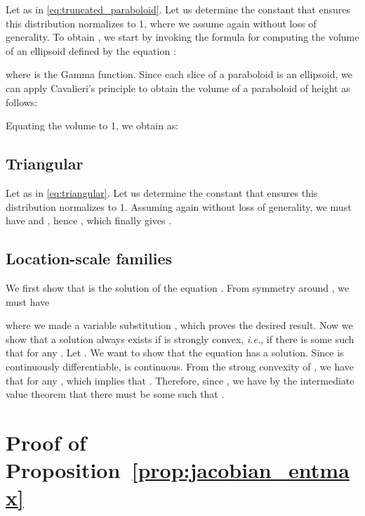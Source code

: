 \documentclass{article}
\newcommand{\remove}[1]{}
\begin{document}
Let  as in \eqref{eq:truncated_paraboloid}.
Let us determine the constant  that ensures this distribution normalizes to 1, where we assume again  without loss of generality. To obtain , we start by invoking the formula for computing the volume of an ellipsoid defined
by the equation :

where  is the Gamma function.
Since each slice of a paraboloid is an ellipsoid, we can apply Cavalieri's principle to obtain the volume of a paraboloid  of height  as follows:

Equating the volume to 1, we obtain  as:


\subsection{Triangular}\label{sec:proof_triangular}

Let  as in \eqref{eq:triangular}.
Let us determine the constant  that ensures this distribution normalizes to 1.
Assuming again  without loss of generality, we must have
 and , hence
, which finally gives
.

\remove{
The negentropy of this distribution is

}

\subsection{Location-scale families}\label{sec:proof_location_scale}

We first show that  is the solution of the equation .
From symmetry around , we must have

where we made a variable substitution ,
which proves the desired result.
Now we show that a solution always exists if  is strongly convex, {\it i.e.}, if there is some  such that
 for any .
Let . We want to show that the equation  has a solution. Since  is continuously differentiable,  is continuous.
From the strong convexity of , we have that  for any , which implies that .
Therefore, since , we have by the intermediate value theorem that there must be some  such that .








\section{Proof of Proposition~\ref{prop:jacobian_entmax}}\label{sec:proof_jacobian_entmax}
\end{document}
